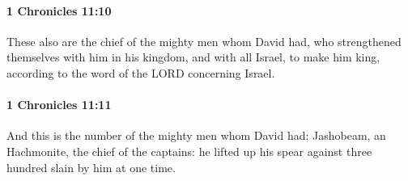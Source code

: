 		\paragraph{1 Chronicles 11:10} %
			\label{1CHRONICLES-11-10}

			These also are the chief of the mighty men whom David had, who strengthened themselves with him in his kingdom, and with all Israel, to make him king, according to the word of the LORD concerning Israel.


		\paragraph{1 Chronicles 11:11} %
			\label{1CHRONICLES-11-11}

			And this is the number of the mighty men whom David had; Jashobeam, an Hachmonite, the chief of the captains: he lifted up his spear against three hundred slain by him at one time.


